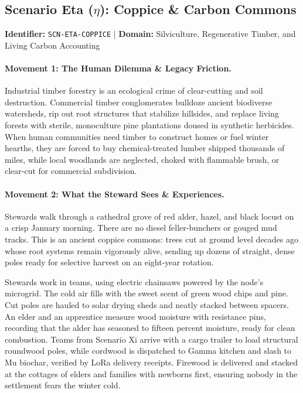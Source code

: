 \subsection{Scenario Eta (\texorpdfstring{$\eta$}{Eta}): Coppice \& Carbon Commons}
\label{subsec:scn_eta}
\textbf{Identifier:} \texttt{SCN-ETA-COPPICE} \quad | \quad \textbf{Domain:} Silviculture, Regenerative Timber, and Living Carbon Accounting

\paragraph{Movement 1: The Human Dilemma \& Legacy Friction.}
Industrial timber forestry is an ecological crime of clear-cutting and soil destruction. Commercial timber conglomerates bulldoze ancient biodiverse watersheds, rip out root structures that stabilize hillsides, and replace living forests with sterile, monoculture pine plantations doused in synthetic herbicides. When human communities need timber to construct homes or fuel winter hearths, they are forced to buy chemical-treated lumber shipped thousands of miles, while local woodlands are neglected, choked with flammable brush, or clear-cut for commercial subdivision.

\paragraph{Movement 2: What the Steward Sees \& Experiences.}
Stewards walk through a cathedral grove of red alder, hazel, and black locust on a crisp January morning. There are no diesel feller-bunchers or gouged mud tracks. This is an ancient coppice commons: trees cut at ground level decades ago whose root systems remain vigorously alive, sending up dozens of straight, dense poles ready for selective harvest on an eight-year rotation. 

Stewards work in teams, using electric chainsaws powered by the node's microgrid. The cold air fills with the sweet scent of green wood chips and pine. Cut poles are hauled to solar drying sheds and neatly stacked between spacers. An elder and an apprentice measure wood moisture with resistance pins, recording that the alder has seasoned to fifteen percent moisture, ready for clean combustion. Teams from Scenario Xi arrive with a cargo trailer to load structural roundwood poles, while cordwood is dispatched to Gamma kitchen and slash to Mu biochar, verified by LoRa delivery receipts. Firewood is delivered and stacked at the cottages of elders and families with newborns first, ensuring nobody in the settlement fears the winter cold.

